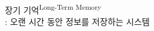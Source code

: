 \documentclass{beamer}
\begin{document}
\begin{frame}{장기 기억\textsuperscript{Long-Term Memory}\\\normalsize{: 오랜 시간 동안 정보를 저장하는 시스템}}

\end{frame}
\end{document}

